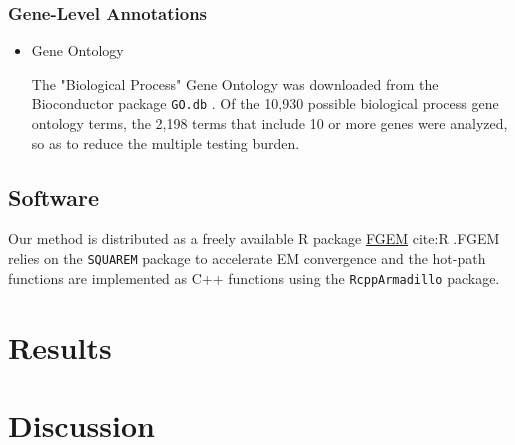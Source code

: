\documentclass[11pt]{article}
\begin{document}
\subsubsection*{Gene-Level Annotations}
\label{sec:org6db44cc}

\begin{itemize}
\item Gene Ontology
\label{sec:org9a09e61}

The "Biological Process" Gene Ontology \cite{GO}  was downloaded from the Bioconductor package \texttt{GO.db} \cite{godb}. Of the 10,930 possible biological process gene ontology terms, the 2,198 terms that 
include 10 or more genes were analyzed, so as to reduce the multiple testing burden.
\end{itemize}


\subsection*{Software}
\label{sec:orga90cb87}

Our method is distributed as a freely available R package \href{https://github.com/CreRecombinase/FGEM}{FGEM} cite:R .FGEM relies on the \texttt{SQUAREM} package to accelerate EM convergence  \cite{squarem}   
and the hot-path functions are implemented as C++ functions using the \texttt{RcppArmadillo} \cite{RcppArmadillo} package.  


\section*{Results}
\label{sec:orgbf5c63a}

\section*{Discussion}
\label{sec:org0be4266}








\end{document}
